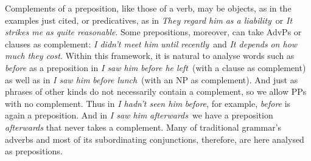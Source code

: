Complements of a preposition, like those of a verb, may be objects, as in the examples just cited, or predicatives, as in \textit{They regard him} \ob\textit{as a liability}\cb\ or \textit{It strikes me} \ob\textit{as quite reasonable}\cb. Some prepositions, moreover, can take AdvPs or clauses as complement: \textit{I didn't meet him} \ob\textit{until recently}\cb\ and \textit{It depends} \ob\textit{on how much they cost}\cb. Within this framework, it is natural to analyse words such as \textit{before} as a preposition in \textit{I saw him} \ob\textit{before he left}\cb\ (with a clause as complement) as well as in \textit{I saw him} \ob\textit{before lunch}\cb\ (with an NP as complement). And just as phrases of other kinds do not necessarily contain a complement, so we allow PPs with no complement. Thus in \textit{I hadn't seen him} \ob\textit{before}\cb, for example, \textit{before} is again a preposition. And in \textit{I saw him} \ob\textit{afterwards}\cb\ we have a preposition \textit{afterwards} that never takes a complement. Many of traditional grammar's adverbs and most of its subordinating conjunctions, therefore, are here analysed as prepositions.

